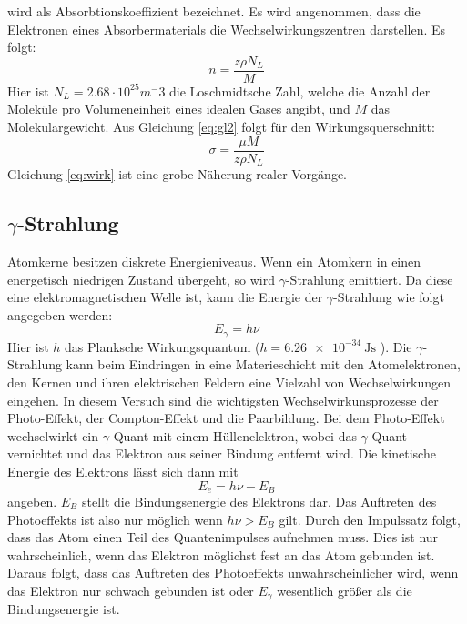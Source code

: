 wird als Absorbtionskoeffizient bezeichnet.
Es wird angenommen, dass die Elektronen eines Absorbermaterials die Wechselwirkungszentren darstellen.
Es folgt:
\begin{equation}
  n= \frac{z \rho N_L}{M}
  \label{eq:gl2}
\end{equation}
Hier ist $N_L=2.68\cdot 10^{25} m^-3$ \cite{Nl} die Loschmidtsche Zahl, welche die Anzahl der Moleküle pro Volumeneinheit eines idealen Gases angibt, und $M$ das Molekulargewicht.
Aus Gleichung \eqref{eq:gl2} folgt für den Wirkungsquerschnitt:
\begin{equation}
  \sigma=\frac{\mu M}{z \rho N_L}
  \label{eq:wirk}
\end{equation}
Gleichung \eqref{eq:wirk} ist eine grobe Näherung realer Vorgänge.
%
\subsection{\texorpdfstring{$\gamma$}{Gamma}-Strahlung}
Atomkerne besitzen diskrete Energieniveaus.
Wenn ein Atomkern in einen energetisch niedrigen Zustand übergeht, so wird $\gamma$-Strahlung emittiert.
Da diese eine elektromagnetischen Welle ist, kann die Energie der $\gamma$-Strahlung
wie folgt angegeben werden:
\begin{equation}
  E_\gamma = h\nu
\end{equation}
Hier ist $h$ das Planksche Wirkungsquantum ($h=\SI{6.26e-34}{\joule\second}$ \cite{planck}).
Die $\gamma$-Strahlung kann beim Eindringen in eine Materieschicht mit den Atomelektronen, den Kernen und ihren elektrischen Feldern eine Vielzahl von Wechselwirkungen eingehen.
In diesem Versuch sind die wichtigsten Wechselwirkunsprozesse der Photo-Effekt, der Compton-Effekt und die Paarbildung.
Bei dem Photo-Effekt wechselwirkt ein $\gamma$-Quant mit einem Hüllenelektron, wobei das $\gamma$-Quant vernichtet und das Elektron aus seiner Bindung entfernt wird.
Die kinetische Energie des Elektrons lässt sich dann mit
\begin{equation}
  E_e = h\nu - E_B
\end{equation}
angeben.
$E_B$ stellt die Bindungsenergie des Elektrons dar.
Das Auftreten des Photoeffekts ist also nur möglich wenn $h\nu > E_B$ gilt.
Durch den Impulssatz folgt, dass das Atom einen Teil des Quantenimpulses aufnehmen muss.
Dies ist nur wahrscheinlich, wenn das Elektron möglichst fest an das Atom gebunden ist.
Daraus folgt, dass das Auftreten des Photoeffekts unwahrscheinlicher wird, wenn das Elektron nur schwach gebunden ist
oder $E_\gamma$ wesentlich größer als die Bindungsenergie ist.


